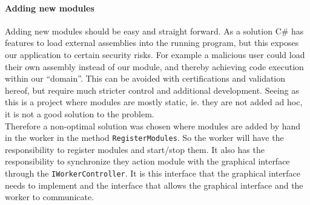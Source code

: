 \documentclass{article}
\begin{document}


\paragraph{Adding new modules} Adding new modules should be easy and straight forward. As a solution C\# has features to load external assemblies into the running program\cite{url:considerations:load-assembly-runtime}, but this exposes our application to certain security risks. For example a malicious user could load their own assembly instead of our module, and thereby achieving code execution within our \enquote{domain}. This can be avoided with certifications and validation hereof, but require much stricter control and additional development. Seeing as this is a project where modules are mostly static, ie. they are not added ad hoc, it is not a good solution to the problem.
\\
Therefore a non-optimal solution was chosen where modules are added by hand in the worker in the method \texttt{RegisterModules}. So the worker will have the responsibility to register modules and start/stop them. It also has the responsibility to synchronize they action module with the graphical interface through the \texttt{IWorkerController}. It is this interface that the graphical interface needs to implement and the interface that allows the graphical interface and the worker to communicate.
\end{document}
